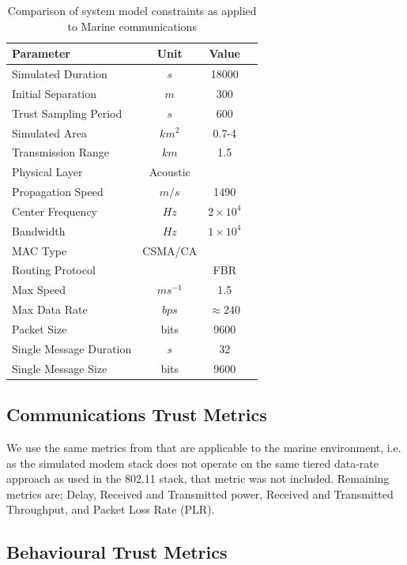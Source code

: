 \documentclass{aamas2016}
\begin{document}
%
\begin{table}[h]
	\caption{Comparison of system model constraints as applied to Marine communications} \label{tab:sysconstraints}
	\begin{center}
		\setlength{\tabcolsep}{8pt}
		\begin{tabular}{lccc}
			\hline
			Parameter & Unit & Value \\
			\hline
			Simulated Duration & $s$ & 18000\\
			Initial Separation & $m$ & 300\\
			Trust Sampling Period & $s$ & 600 \\
			Simulated Area & $km^2$ &  0.7-4 \\
			Transmission Range & $km$ & 1.5 \\
			Physical Layer & Acoustic\\
			Propagation Speed& $m/s$ & 1490\\
			Center Frequency& $Hz$ & $2 \times 10^4$ \\
			Bandwidth& $Hz$ & $1\times10^4$\\
			MAC Type & CSMA/CA\\
			Routing Protocol & & FBR \\
			Max Speed & $ms^{-1}$ & 1.5 \\
			Max Data Rate & $bps$ & $\approx 240$ \\
			Packet Size & bits &  9600 \\
			Single Message Duration & $s$ & 32 \\
			Single Message Size & bits & $9600$ \\
			\hline
		\end{tabular}
		\setlength{\tabcolsep}{6pt}
	\end{center}
\end{table}
%

\subsection{Communications Trust Metrics}

We use the same metrics from \cite{Guo2012} that are applicable to the marine environment, i.e. as the simulated modem stack does not operate on the same tiered data-rate approach as used in the 802.11 stack, that metric was not included. Remaining metrics are; Delay, Received and Transmitted power, Received and Transmitted Throughput, and Packet Loss Rate (PLR).

\subsection{Behavioural Trust Metrics}
\end{document}

